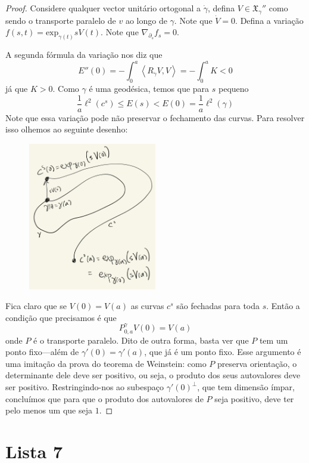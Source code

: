 \begin{proof}
Considere qualquer vector unitário ortogonal a $\dot \gamma$, defina $V\in
\mathfrak{X}_{\gamma}''$ como sendo o transporte paralelo de $v$ ao longo de
$\gamma$. Note que $\dot V=0$. Defina a variação
$f(s,t)=\text{exp}_{\gamma(t)}sV(t)$. Note que
$\nabla_{\partial_s}f_s=0$.

A segunda fórmula da variação nos diz que \[E''(0)=-\int_0^a \left<R_{\dot
\gamma}V,V\right>=-\int_0^a K<0\] já que $K>0$. Como $\gamma$ é uma geodésica,
temos que para $s$ pequeno \[\frac{1}{a}\ell^2(c^s)\leq E(s) < E(0)=
\frac{1}{a}\ell^2(\gamma)\] Note que essa variação pode não preservar o
fechamento das curvas. Para resolver isso olhemos ao seguinte desenho:
\begin{figure}[H]
\centering
\includegraphics[width=0.5\textwidth]{figures/free-homotopy-variation}
\end{figure}
Fica claro que se $V(0)=V(a)$ as curvas $c^s$ são fechadas para toda $s$. Então
a condição que precisamos é que \[P^\gamma_{0,a}V(0)=V(a)\] onde $P$ é o
transporte paralelo. Dito de outra forma, basta ver que $P$ tem um ponto
fixo---além de $\gamma'(0)=\gamma'(a)$, que já é um ponto fixo. Esse argumento é
uma imitação da prova do teorema de Weinstein: como $P$ preserva orientação, o
determinante dele deve ser positivo, ou seja, o produto dos seus autovalores
deve ser positivo. Restringindo-nos ao subespaço $\gamma'(0)^\perp$, que tem
dimensão ímpar, concluímos que para que o produto dos autovalores de $P$ seja
positivo, deve ter pelo menos um que seja $1$.
\end{proof}

\section{Lista 7}
\label{section-lista-7}

